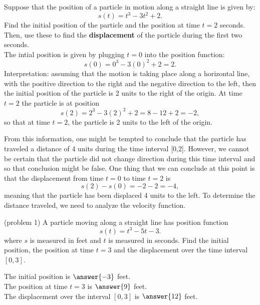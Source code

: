 \documentclass{ximera}
\begin{document}
\begin{example}[example 1]
Suppose that the position of a particle in motion along a straight line is given by:
\[s(t) = t^3 - 3t^2 + 2.\]
Find the initial position of the particle and the position at time $t = 2$ seconds.
Then, use these to find the \textbf{displacement} of the particle during the first two seconds.\\

The intial position is given by plugging $t=0$ into the position function: 
\[s(0) = 0^3 -3(0)^2 + 2 = 2.\]
Interpretation: assuming that the motion is taking place along a horizontal line,
with the positive direction to the right and the negative direction to the left, then the initial position 
of the particle is 2 units to the right of the origin.
At time $t=2$ the particle is at position
\[s(2) = 2^3 -3(2)^2 + 2 = 8 - 12 + 2 = -2,\]
so that at time $t = 2$, the particle is 2 units to the left of the origin.
\begin{center}
\end{center}

From this information, one might be tempted to conclude that the particle has traveled a distance  of 4 units
during the time interval [0,2].  However, we cannot be certain that the particle did not change direction 
during this time interval and so that conclusion might be false. 
One thing that we can conclude at this point is that the displacement from 
time $t = 0$ to time $t = 2$ is
\[s(2) - s(0) = -2 - 2 = -4,\]
meaning that the particle has been displaced 4 units to the left. To determine the distance traveled, we need to analyze the velocity function.  




\end{example}



\begin{problem}(problem 1)
A particle moving along a straight line has position function
\[s(t) = t^3 - 5t -3.\]
where $s$ is measured in feet and $t$ is measured in seconds.
Find the initial position, the position at time $t = 3$ 
and the displacement over the time interval $[0,3]$.

The initial position is $\answer{-3}$ feet.\\
The position at time $t=3$ is $\answer{9}$ feet.\\
The displacement over the interval $[0,3]$ is $\answer{12}$ feet.\\

\end{problem}
\end{document}
